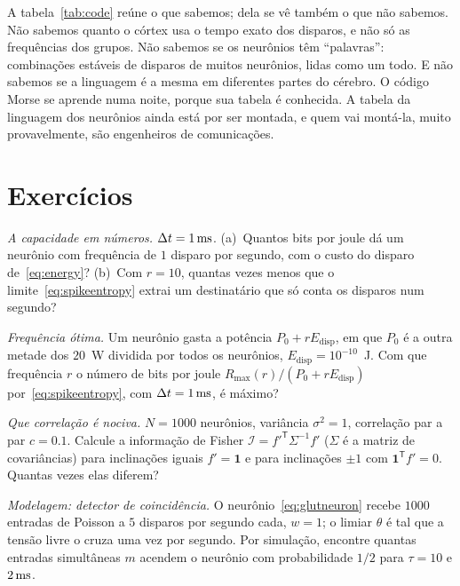 A tabela~\ref{tab:code} reúne o que sabemos; dela se vê também o que não sabemos. Não sabemos quanto o córtex usa o tempo exato dos disparos, e não só as frequências dos grupos. Não sabemos se os neurônios têm ``palavras'': combinações estáveis de disparos de muitos neurônios, lidas como um todo. E não sabemos se a linguagem é a mesma em diferentes partes do cérebro. O código Morse se aprende numa noite, porque sua tabela é conhecida. A tabela da linguagem dos neurônios ainda está por ser montada, e quem vai montá-la, muito provavelmente, são engenheiros de comunicações.

\section{Exercícios}

\begin{exercise}[\lvlA]
\label{ex:04:1}
\emph{A capacidade em números.} $\Delta t=1\,\text{ms}$. (a)~Quantos bits por joule dá um neurônio com frequência de $1$ disparo por segundo, com o custo do disparo de~\eqref{eq:energy}? (b)~Com $r=10$, quantas vezes menos que o limite~\eqref{eq:spikeentropy} extrai um destinatário que só conta os disparos num segundo?
\end{exercise}

\begin{exercise}[\lvlB]
\label{ex:04:2}
\emph{Frequência ótima.} Um neurônio gasta a potência $P_0+rE_{\text{disp}}$, em que $P_0$ é a outra metade dos $20$~W dividida por todos os neurônios, $E_{\text{disp}}=10^{-10}$~J. Com que frequência $r$ o número de bits por joule $R_{\max}(r)/(P_0+rE_{\text{disp}})$ por~\eqref{eq:spikeentropy}, com $\Delta t=1\,\text{ms}$, é máximo?
\end{exercise}

\begin{exercise}[\lvlB]
\label{ex:04:3}
\emph{Que correlação é nociva.} $N=1000$ neurônios, variância $\sigma^2=1$, correlação par a par $c=0.1$. Calcule a informação de Fisher $\mathcal I=f'^{\mathsf T}\Sigma^{-1}f'$ ($\Sigma$ é a matriz de covariâncias) para inclinações iguais $f'=\mathbf 1$ e para inclinações $\pm1$ com $\mathbf 1^{\mathsf T}f'=0$. Quantas vezes elas diferem?
\end{exercise}

\begin{exercise}[\lvlB]
\label{ex:04:4}
\emph{Modelagem: detector de coincidência.} O neurônio~\eqref{eq:glutneuron} recebe $1000$ entradas de Poisson a $5$ disparos por segundo cada, $w=1$; o limiar $\theta$ é tal que a tensão livre o cruza uma vez por segundo. Por simulação, encontre quantas entradas simultâneas $m$ acendem o neurônio com probabilidade $1/2$ para $\tau=10$ e $2\,\text{ms}$.
\end{exercise}

